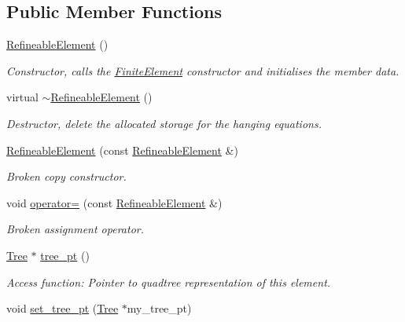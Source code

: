 \subsection*{Public Member Functions}
\begin{DoxyCompactItemize}
\item 
\hyperlink{classoomph_1_1RefineableElement_aaf98d058be56325fc220ca19331fe1c2}{Refineable\+Element} ()
\begin{DoxyCompactList}\small\item\em Constructor, calls the \hyperlink{classoomph_1_1FiniteElement}{Finite\+Element} constructor and initialises the member data. \end{DoxyCompactList}\item 
virtual \hyperlink{classoomph_1_1RefineableElement_ae38105494105430513f05c3cd22b8f48}{$\sim$\+Refineable\+Element} ()
\begin{DoxyCompactList}\small\item\em Destructor, delete the allocated storage for the hanging equations. \end{DoxyCompactList}\item 
\hyperlink{classoomph_1_1RefineableElement_ac0720a20f0d462ee3d1e6681cc9995ac}{Refineable\+Element} (const \hyperlink{classoomph_1_1RefineableElement}{Refineable\+Element} \&)
\begin{DoxyCompactList}\small\item\em Broken copy constructor. \end{DoxyCompactList}\item 
void \hyperlink{classoomph_1_1RefineableElement_a956e3350b763de6a0d96915608fee827}{operator=} (const \hyperlink{classoomph_1_1RefineableElement}{Refineable\+Element} \&)
\begin{DoxyCompactList}\small\item\em Broken assignment operator. \end{DoxyCompactList}\item 
\hyperlink{classoomph_1_1Tree}{Tree} $\ast$ \hyperlink{classoomph_1_1RefineableElement_a17201434f10a993b2ac5ba2bccd9c2b7}{tree\+\_\+pt} ()
\begin{DoxyCompactList}\small\item\em Access function\+: Pointer to quadtree representation of this element. \end{DoxyCompactList}\item 
void \hyperlink{classoomph_1_1RefineableElement_acd004aa826f0249007b63d573e9b8b36}{set\+\_\+tree\+\_\+pt} (\hyperlink{classoomph_1_1Tree}{Tree} $\ast$my\+\_\+tree\+\_\+pt)

\end{DoxyCompactItemize}
